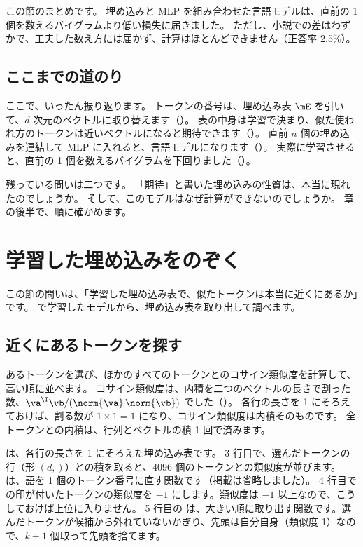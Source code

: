 この節のまとめです。
埋め込みと MLP を組み合わせた言語モデルは、直前の 1 個を数えるバイグラムより低い損失に届きました。
ただし、小説での差はわずかで、工夫した数え方には届かず、計算はほとんどできません（正答率 2.5\%）。

\subsection*{ここまでの道のり}

ここで、いったん振り返ります。
トークンの番号は、埋め込み表 $\mE$ を引いて、$d$ 次元のベクトルに取り替えます（）。
表の中身は学習で決まり、似た使われ方のトークンは近いベクトルになると期待できます（）。
直前 $n$ 個の埋め込みを連結して MLP に入れると、言語モデルになります（）。
実際に学習させると、直前の 1 個を数えるバイグラムを下回りました（）。

残っている問いは二つです。
「期待」と書いた埋め込みの性質は、本当に現れたのでしょうか。
そして、このモデルはなぜ計算ができないのでしょうか。
章の後半で、順に確かめます。

\section{学習した埋め込みをのぞく}\label{sec:emb-neighbors}

この節の問いは、「学習した埋め込み表で、似たトークンは本当に近くにあるか」です。
で学習したモデルから、埋め込み表を取り出して調べます。

\subsection*{近くにあるトークンを探す}

あるトークンを選び、ほかのすべてのトークンとのコサイン類似度を計算して、高い順に並べます。
コサイン類似度は、内積を二つのベクトルの長さで割った数、$\va^\T\vb/(\norm{\va}\,\norm{\vb})$ でした（）。
各行の長さを 1 にそろえておけば、割る数が $1\times1=1$ になり、コサイン類似度は内積そのものです。
全トークンとの内積は、行列とベクトルの積 1 回で済みます。


 は、各行の長さを 1 にそろえた埋め込み表です。
3 行目で、選んだトークンの行（形 $(d,)$）との積を取ると、4096 個のトークンとの類似度が並びます。
 は、語を 1 個のトークン番号に直す関数です（掲載は省略しました）。
4 行目で  の印が付いたトークンの類似度を $-1$ にします。類似度は $-1$ 以上なので、こうしておけば上位に入りません。
5 行目の  は、大きい順に取り出す関数です。選んだトークンが候補から外れていないかぎり、先頭は自分自身（類似度 1）なので、$k+1$ 個取って先頭を捨てます。

